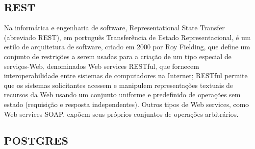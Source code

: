 \documentclass[a4paper,12pt]{article}
\begin{document}
\subsection{REST}
Na informática e engenharia de software, Representational State Transfer (abreviado REST), em português Transferência de Estado Representacional, é um estilo de arquitetura de software, criado em 2000 por Roy Fielding, que define um conjunto de restrições a serem usadas para a criação de um tipo especial de serviços-Web, denominados Web services RESTful, que fornecem interoperabilidade entre sistemas de computadores na Internet; RESTful permite que os sistemas solicitantes acessem e manipulem representações textuais de recursos da Web usando um conjunto uniforme e predefinido de operações sem estado (requisição e resposta independentes). Outros tipos de Web services, como Web services SOAP, expõem seus próprios conjuntos de operações arbitrários\cite{rest}.
\subsection{POSTGRES}
\end{document}
